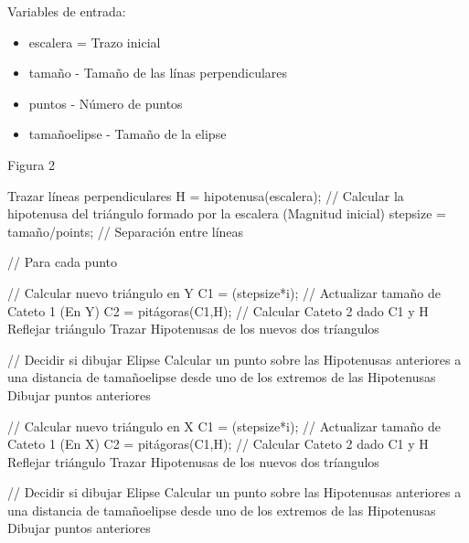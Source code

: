 \documentclass[letter,10pt]{article}
\begin{document}
 

Variables de entrada:
\begin{itemize}
	\item  escalera = Trazo inicial
	\item  tamaño - Tamaño de las línas perpendiculares
	\item  puntos - Número de puntos
	\item tamañoelipse - Tamaño de la elipse
\end{itemize}

\begin{algorithm}
	\caption{Figura 2} 
	\begin{algorithmic}[1]

		\State Trazar líneas perpendiculares
		\State H = hipotenusa(escalera); // Calcular la hipotenusa del triángulo formado por la escalera (Magnitud inicial)
		\State stepsize = tamaño/points; // Separación entre líneas

		 // Para cada punto

			\State // Calcular nuevo triángulo en Y
			\State  C1 = (stepsize*i);   // Actualizar tamaño de Cateto 1 (En Y)
			\State  C2 = pitágoras(C1,H); // Calcular Cateto 2 dado C1 y H
			\State  Reflejar triángulo
			\State 	Trazar Hipotenusas de los nuevos dos tríangulos
			
			 // Decidir si dibujar Elipse
				\State Calcular un punto sobre las Hipotenusas anteriores a una distancia de tamañoelipse desde uno de los extremos de las Hipotenusas
				\State Dibujar puntos anteriores
			\EndIf

			\State // Calcular nuevo triángulo en X
			\State  C1 = (stepsize*i);   // Actualizar tamaño de Cateto 1 (En X)
			\State  C2 = pitágoras(C1,H); // Calcular Cateto 2 dado C1 y H
			\State  Reflejar triángulo
			\State 	Trazar Hipotenusas de los nuevos dos tríangulos
			
			 // Decidir si dibujar Elipse
				\State Calcular un punto sobre las Hipotenusas anteriores a una distancia de tamañoelipse desde uno de los extremos de las Hipotenusas
				\State Dibujar puntos anteriores
			\EndIf
		\EndFor
	\end{algorithmic} 
\end{algorithm}
\end{document}
